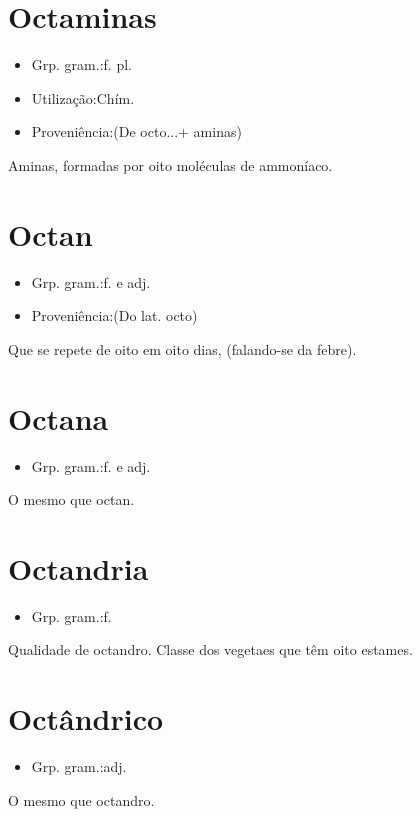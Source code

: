 \section{Octaminas}
\begin{itemize}
\item {Grp. gram.:f. pl.}
\end{itemize}
\begin{itemize}
\item {Utilização:Chím.}
\end{itemize}
\begin{itemize}
\item {Proveniência:(De \textunderscore octo...\textunderscore  + \textunderscore aminas\textunderscore )}
\end{itemize}
Aminas, formadas por oito moléculas de ammoníaco.
\section{Octan}
\begin{itemize}
\item {Grp. gram.:f.  e  adj.}
\end{itemize}
\begin{itemize}
\item {Proveniência:(Do lat. \textunderscore octo\textunderscore )}
\end{itemize}
Que se repete de oito em oito dias, (falando-se da febre).
\section{Octana}
\begin{itemize}
\item {Grp. gram.:f.  e  adj.}
\end{itemize}
O mesmo que \textunderscore octan\textunderscore .
\section{Octandria}
\begin{itemize}
\item {Grp. gram.:f.}
\end{itemize}
Qualidade de octandro.
Classe dos vegetaes que têm oito estames.
\section{Octândrico}
\begin{itemize}
\item {Grp. gram.:adj.}
\end{itemize}
O mesmo que \textunderscore octandro\textunderscore .
